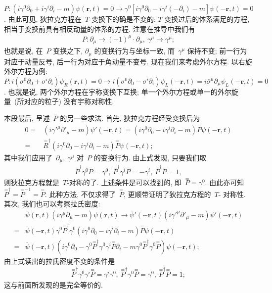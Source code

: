 $P: (i\gamma^0\partial_0+i\gamma^i\partial_i-m)\psi(\bm{r},t)=0\rightarrow\gamma^0\left[i\gamma^0\partial_0-i\gamma^i(-\partial_i)-m\right]\psi(-\bm{r},t)=0$. 由此可见, 狄拉克方程在~$T$-变换下的确是不变的: $T$ 变换过后的体系满足的方程, 相当于变换前具有相反动量的体系的方程. 注意在推导中我们有
\begin{align}
P: \partial_\mu\rightarrow (-1)^\mu\cdot\partial_\mu,~\gamma^\mu\rightarrow\gamma^\mu;
\end{align}
也就是说, 在~$P$ 变换之下, $\partial_\mu$ 的变换行为与坐标一致, 而~$\gamma^\mu$ 保持不变; 前一行为对应于动量反号, 后一行为对应于角动量不变号. 现在我们来考虑外尔方程. 以右旋外尔方程为例:~$P:i(\sigma^0\partial_0+\sigma^i\partial_i)\psi_R(\bm{r},t)=0\rightarrow i(\sigma^0\partial_0-\sigma^i\partial_i)\psi_L(-\bm{r},t)=i\bar{\sigma}^\mu\partial_\mu\psi_L(-\bm{r},t)=0$. 也就是说, 两个外尔方程在宇称变换下互换; 单一个外尔方程或单一的外尔旋量~(所对应的粒子) 没有宇称对称性.



本段最后, 呈述~$\overset{=}{P}$ 的另一些求法. 首先, 狄拉克方程经受变换后为
\begin{align}
0=&(i\gamma'^\mu\partial'_\mu-m)\psi'(-\bm{r},t)=(i\gamma^0\partial_0-i\gamma^i\partial_i-m)\overset{=}{P}\psi(-\bm{r},t)\nonumber\\
=&\overset{=}{R}^\dag(i\gamma^0\partial_0-i\gamma^i\partial_i-m)\overset{=}{P}\psi(-\bm{r},t);
\end{align}
其中我们应用了~$\partial_\mu,~\gamma^\mu$ 对~$P$ 的变换行为. 由上式发现, 只要我们取
\begin{align}
\overset{=}{P}^\dag\gamma^0\overset{=}{P}=\gamma^0,~\overset{=}{P}^\dag\gamma^i\overset{=}{P}=-\gamma^i,~\overset{=}{P}^\dag\overset{=}{P}=1,
\end{align}
则狄拉克方程就是~$T$-对称的了. 上述条件是可以找到的, 即~$\overset{=}{P}=\gamma^0$. 由此亦可知~$\overset{=}{P}^\dag=\overset{=}{P}^{-1}=\overset{=}{P}$. 此种方法, 不仅求得了~$\overset{=}{P}$, 更顺带证明了狄拉克方程的~$T$- 对称性. 其次, 我们也可以考察拉氏密度:
\begin{align}
&\bar{\psi}(\bm{r},t)(i\gamma^\mu\partial_\mu-m)\psi(\bm{r},t)\rightarrow\bar{\psi}'(-\bm{r},t)(i\gamma'^\mu\partial'_\mu-m)\psi'(-\bm{r},t)\nonumber\\
=&\bar{\psi}(-\bm{r},t)\gamma^0\overset{=}{P}^\dag\gamma^0(i\gamma^0\partial_0-i\gamma^i\partial_i-m)\overset{=}{P}\psi(-\bm{r},t)\nonumber\\
=&\bar{\psi}(-\bm{r},t)(i\gamma^0\partial_0-\gamma^0\overset{=}{P}^\dag\gamma^0\gamma^i\overset{=}{P}\partial_i-m\gamma^0\overset{=}{P}^\dag\gamma^0\overset{=}{P})\psi(-\bm{r},t);
\end{align}
由上式读出的拉氏密度不变的条件是
\begin{align}
\overset{=}{P}^\dag\gamma^0\gamma^i\overset{=}{P}=\gamma^i\gamma^0,~\overset{=}{P}^\dag\gamma^0\overset{=}{P}=\gamma^0,~\overset{=}{P}^\dag\overset{=}{P}=1;
\end{align}
这与前面所发现的是完全等价的.




